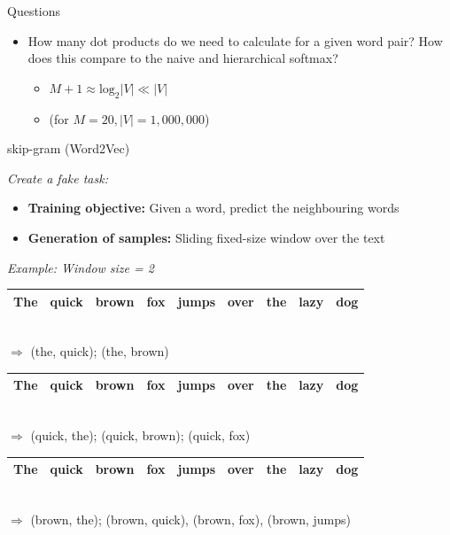 
\begin{vbframe}{Questions}

\vfill

\begin{itemize}
	\item \ques How many dot products do we need to calculate for a given word pair? How does this compare to the naive and hierarchical softmax?
		\begin{itemize}
			\item $M+1 \approx \mathrm{log}_2 |V| \ll |V|$
			\item[] (for $M=20, |V| = 1,000,000$)
		\end{itemize}
\end{itemize}

\vfill

\end{vbframe}


\begin{vbframe}{skip-gram (Word2Vec)}

\vfill

\textit{Create a fake task:}

\begin{itemize}
	\item \textbf{Training objective:} Given a word, predict the neighbouring words
	\item \textbf{Generation of samples:} Sliding fixed-size window over the text
\end{itemize}

\textit{Example: Window size = 2}

\medskip

\begin{tabular}{|c|c|c|cccccc|}
\hline
\cellcolor{blue!15}The & \cellcolor{blue!65}quick & \cellcolor{blue!65}brown & fox & jumps & over & the & lazy & dog \\
\hline
\end{tabular}\\
$\Rightarrow$ \qquad (the, quick); (the, brown)
\begin{tabular}{|c|c|c|c|ccccc|}
\hline
\cellcolor{blue!65}The & \cellcolor{blue!15}quick & \cellcolor{blue!65}brown & \cellcolor{blue!65}fox & jumps & over & the & lazy & dog \\
\hline
\end{tabular}\\
$\Rightarrow$ \qquad (quick, the); (quick, brown); (quick, fox)
\begin{tabular}{|c|c|c|c|c|cccc|}
\hline
\cellcolor{blue!65}The & \cellcolor{blue!65}quick & \cellcolor{blue!15}brown & \cellcolor{blue!65}fox & \cellcolor{blue!65}jumps & over & the & lazy & dog \\
\hline
\end{tabular}\\
$\Rightarrow$ \qquad (brown, the); (brown, quick), (brown, fox), (brown, jumps)

\vfill

\end{vbframe}

